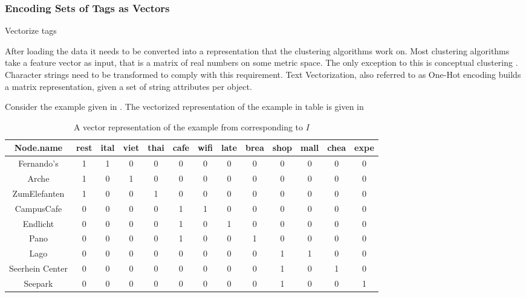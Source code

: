 \subsubsection{Encoding Sets of Tags as Vectors}
\begin{algorithm}[htp]
\caption{Vectorize tags}\label{vect}
\end{algorithm} 
\noindent After loading the data it needs to be converted into a representation that the clustering algorithms work on. Most clustering algorithms take a feature vector as input, that is a matrix of real numbers on some metric space. The only exception to this is conceptual clustering . Character strings need to be transformed to comply with this requirement. Text Vectorization, also referred to as One-Hot encoding builds a matrix representation, given a set of string attributes per object.

\noindent Consider the example given in . The vectorized representation of the example in table  is given in 
\begin{table}[htp]
     \centering
     \begin{tabular}{|c|c|c|c|c|c|c|c|c|c|c|c|c|} \hline
            Node.name & rest & ital & viet & thai & cafe & wifi & late & brea & shop & mall & chea & expe \\ \hline \hline
            Fernando's      & 1 & 1 & 0 & 0 & 0 & 0 & 0 & 0 & 0 & 0 & 0 & 0  \\  \hline
            Arche           & 1 & 0 & 1 & 0 & 0 & 0 & 0 & 0 & 0 & 0 & 0 & 0  \\  \hline
            ZumElefanten    & 1 & 0 & 0 & 1 & 0 & 0 & 0 & 0 & 0 & 0 & 0 & 0  \\ \hline
            CampusCafe      & 0 & 0 & 0 & 0 & 1 & 1 & 0 & 0 & 0 & 0 & 0 & 0 \\ \hline
            Endlicht        & 0 & 0 & 0 & 0 & 1 & 0 & 1 & 0 & 0 & 0 & 0 & 0 \\ \hline
            Pano            & 0 & 0 & 0 & 0 & 1 & 0 & 0 & 1 & 0 & 0 & 0 & 0 \\ \hline
            Lago            & 0 & 0 & 0 & 0 & 0 & 0 & 0 & 0 & 1 & 1 & 0 & 0 \\ \hline
            Seerhein Center & 0 & 0 & 0 & 0 & 0 & 0 & 0 & 0 & 1 & 0 & 1 & 0 \\ \hline
            Seepark         & 0 & 0 & 0 & 0 & 0 & 0 & 0 & 0 & 1 & 0 & 0 & 1\\ \hline
        \end{tabular}
    \caption{A vector representation of the example from  corresponding to $I$}
    \label{tab:vect_running_ex}
\end{table}{} \\

